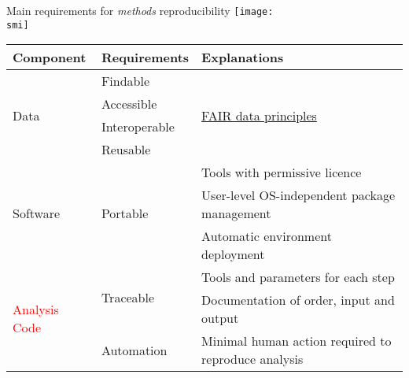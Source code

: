   \begin{frame}{Main requirements for \emph{methods} reproducibility}
    \def\smi{out/ln/updir/mw-gcthesis-oral/ink/reproducibility/arrow_reproducibility.pdf}
    \texttt{[image: \\smi]}

    {\scriptsize
    \begin{tabular}{@{}lll@{}}
      \toprule
      Component                      & Requirements                & Explanations            \\ \midrule
      \multirow{4}{*}{\textcolor{NavyBlue}{Data}}          & Findable & \multirow{4}{*}{\href{https://www.force11.org/group/fairgroup/fairprinciples}{FAIR data principles}}   \\
      & Accessible                        &       \\
      & Interoperable                    &        \\ 
      & Reusable                          &       \\ \midrule
      \multirow{3}{*}{\textcolor{OliveGreen}{Software}}             & \multirow{3}{*}{Portable} & Tools with permissive licence \\
      & & User-level OS-independent package management            \\
      & & Automatic environment deployment           \\ \midrule
      \multirow{3}{*}{\textcolor{Red}{Analysis Code}} & \multirow{2}{*}{Traceable} & Tools and parameters for each step       \\
      & & Documentation of order, input and output \\ \cmidrule(l){2-3}
      & Automation & Minimal human action required to reproduce analysis \\ \bottomrule
    \end{tabular}
    }
  \end{frame}
